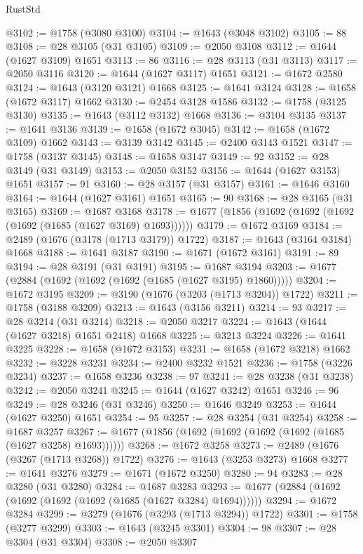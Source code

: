 \begin{lexlean}{RustStd}
\begin{coremodule}
@3102 := @1758 (@3080 @3100)
@3104 := @1643 (@3048 @3102)
@3105 := 88
@3108 := @28 @3105 (@31 @3105)
@3109 := @2050 @3108
@3112 := @1644 (@1627 @3109) @1651
@3113 := 86
@3116 := @28 @3113 (@31 @3113)
@3117 := @2050 @3116
@3120 := @1644 (@1627 @3117) @1651
@3121 := @1672 @2580
@3124 := @1643 (@3120 @3121) @1668
@3125 := @1641 @3124
@3128 := @1658 (@1672 @3117) @1662
@3130 := @2454 @3128 @1586
@3132 := @1758 (@3125 @3130)
@3135 := @1643 (@3112 @3132) @1668
@3136 := @3104 @3135
@3137 := @1641 @3136
@3139 := @1658 (@1672 @3045)
@3142 := @1658 (@1672 @3109) @1662
@3143 := @3139 @3142
@3145 := @2400 @3143 @1521
@3147 := @1758 (@3137 @3145)
@3148 := @1658 @3147
@3149 := 92
@3152 := @28 @3149 (@31 @3149)
@3153 := @2050 @3152
@3156 := @1644 (@1627 @3153) @1651
@3157 := 91
@3160 := @28 @3157 (@31 @3157)
@3161 := @1646 @3160
@3164 := @1644 (@1627 @3161) @1651
@3165 := 90
@3168 := @28 @3165 (@31 @3165)
@3169 := @1687 @3168
@3178 := @1677 (@1856 (@1692 (@1692 (@1692 (@1692 (@1685 (@1627 @3169) @1693))))))
@3179 := @1672 @3169
@3184 := @2489 (@1676 (@3178 (@1713 @3179)) @1722)
@3187 := @1643 (@3164 @3184) @1668
@3188 := @1641 @3187
@3190 := @1671 (@1672 @3161)
@3191 := 89
@3194 := @28 @3191 (@31 @3191)
@3195 := @1687 @3194
@3203 := @1677 (@2884 (@1692 (@1692 (@1692 (@1685 (@1627 @3195) @1860)))))
@3204 := @1672 @3195
@3209 := @3190 (@1676 (@3203 (@1713 @3204)) @1722)
@3211 := @1758 (@3188 @3209)
@3213 := @1643 (@3156 @3211)
@3214 := 93
@3217 := @28 @3214 (@31 @3214)
@3218 := @2050 @3217
@3224 := @1643 (@1644 (@1627 @3218) @1651 @2418) @1668
@3225 := @3213 @3224
@3226 := @1641 @3225
@3228 := @1658 (@1672 @3153)
@3231 := @1658 (@1672 @3218) @1662
@3232 := @3228 @3231
@3234 := @2400 @3232 @1521
@3236 := @1758 (@3226 @3234)
@3237 := @1658 @3236
@3238 := 97
@3241 := @28 @3238 (@31 @3238)
@3242 := @2050 @3241
@3245 := @1644 (@1627 @3242) @1651
@3246 := 96
@3249 := @28 @3246 (@31 @3246)
@3250 := @1646 @3249
@3253 := @1644 (@1627 @3250) @1651
@3254 := 95
@3257 := @28 @3254 (@31 @3254)
@3258 := @1687 @3257
@3267 := @1677 (@1856 (@1692 (@1692 (@1692 (@1692 (@1685 (@1627 @3258) @1693))))))
@3268 := @1672 @3258
@3273 := @2489 (@1676 (@3267 (@1713 @3268)) @1722)
@3276 := @1643 (@3253 @3273) @1668
@3277 := @1641 @3276
@3279 := @1671 (@1672 @3250)
@3280 := 94
@3283 := @28 @3280 (@31 @3280)
@3284 := @1687 @3283
@3293 := @1677 (@2884 (@1692 (@1692 (@1692 (@1692 (@1685 (@1627 @3284) @1694))))))
@3294 := @1672 @3284
@3299 := @3279 (@1676 (@3293 (@1713 @3294)) @1722)
@3301 := @1758 (@3277 @3299)
@3303 := @1643 (@3245 @3301)
@3304 := 98
@3307 := @28 @3304 (@31 @3304)
@3308 := @2050 @3307

\end{coremodule}
\end{lexlean}
